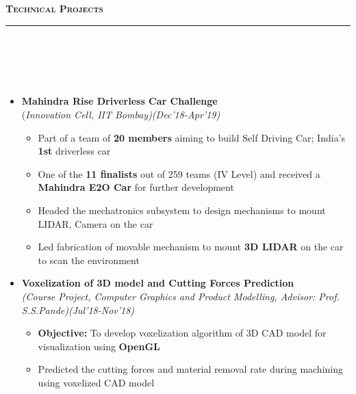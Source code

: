 \documentclass[a4paper,10pt]{article}
\newcommand{\isep}{-2 pt}
\newcommand{\lsep}{-0.5cm}
\newcommand{\resheading}[1]{{\small
        {
            \begin{minipage}
                {0.992\textwidth}\textbf{{\textsc{#1 \vphantom{p\^{E}} }}}
                \\[-0.3cm]
                \hrule
            \end{minipage}
            \\[-0.5cm]
        }
 }}
\begin{document}
\resheading{\textbf{\large Technical Projects}}\\[\lsep] 
\\ [-0.2cm]
\begin{itemize}
\item \textbf{Mahindra Rise Driverless Car Challenge}  \\
    (\emph{Innovation Cell, IIT Bombay)\hfill (Dec'18-Apr'19)}
    \\[-0.6cm]
    \begin{itemize}\itemsep \isep
        \item Part of a team of \textbf{20 members} aiming to build Self Driving Car; India's \textbf{1st} driverless car
    \item One of the \textbf{11 finalists} out of 259 teams (IV Level) and received a \textbf{Mahindra E2O Car} for further development
     \item Headed the mechatronics subsystem to design mechanisms to mount LIDAR, Camera on the car 
    \item Led fabrication of movable mechanism to mount \textbf{3D LIDAR} on the car to scan the environment 
    \end{itemize}

\item \textbf{Voxelization of 3D model and Cutting Forces Prediction} \\
\emph{(Course Project, Computer Graphics and Product Modelling, Advisor: Prof. S.S.Pande)\hfill (Jul'18-Nov'18)}
    \\ [-0.6cm]
      \begin{itemize}\itemsep \isep
  \item \textbf{Objective:} To develop voxelization algorithm of 3D CAD model for visualization using \textbf{OpenGL}
    \item Predicted the cutting forces and material removal rate during machining using voxelized CAD model
	\end{itemize}
    


\end{itemize}
\end{document}
